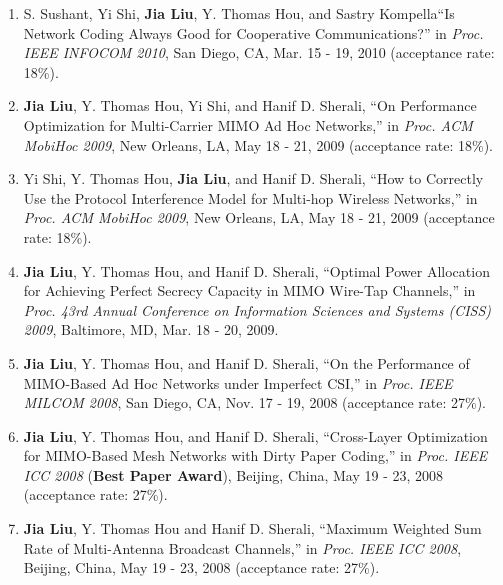 \documentclass[overlapped,line,letterpaper]{res1}
\begin{document}
\begin{resume}
\begin{enumerate}
\vspace*{.08in} \item S. Sushant, Yi Shi, \textbf{Jia Liu}, Y. Thomas Hou, and Sastry Kompella``Is Network Coding Always Good for Cooperative Communications?'' in {\em Proc. IEEE INFOCOM 2010}, San Diego, CA, Mar. 15 - 19, 2010 (acceptance rate: 18\%).

\vspace*{.08in} \item \textbf{Jia Liu}, Y. Thomas Hou, Yi Shi, and Hanif D. Sherali, ``On Performance Optimization for Multi-Carrier MIMO Ad Hoc Networks,'' in {\em Proc. ACM MobiHoc 2009}, New Orleans, LA, May 18 - 21, 2009 (acceptance rate: 18\%).

\vspace*{.08in} \item Yi Shi, Y. Thomas Hou, \textbf{Jia Liu}, and Hanif D. Sherali, ``How to Correctly Use the Protocol Interference Model for Multi-hop Wireless Networks,'' in {\em Proc. ACM MobiHoc 2009}, New Orleans, LA, May 18 - 21, 2009 (acceptance rate: 18\%).

\vspace*{.08in} \item \textbf{Jia Liu}, Y. Thomas Hou, and Hanif D. Sherali, ``Optimal Power Allocation for Achieving Perfect Secrecy Capacity in MIMO Wire-Tap Channels,'' in {\em Proc. 43rd Annual Conference on Information Sciences and Systems (CISS) 2009}, Baltimore, MD, Mar. 18 - 20, 2009.

\vspace*{.08in} \item \textbf{Jia Liu}, Y. Thomas Hou, and Hanif D. Sherali, ``On the Performance of MIMO-Based Ad Hoc Networks under Imperfect CSI,'' in {\em Proc. IEEE MILCOM 2008}, San Diego, CA, Nov. 17 - 19, 2008 (acceptance rate: 27\%).

\vspace*{.08in} \item \textbf{Jia Liu}, Y. Thomas Hou, and Hanif D. Sherali, ``Cross-Layer Optimization for MIMO-Based Mesh Networks with Dirty Paper Coding,'' in {\em Proc. IEEE ICC 2008} ({\bf Best Paper Award}), Beijing, China, May 19 - 23, 2008 (acceptance rate: 27\%).

\vspace*{.08in} \item \textbf{Jia Liu}, Y. Thomas Hou and Hanif D. Sherali, ``Maximum Weighted Sum Rate of Multi-Antenna Broadcast Channels,'' in {\em Proc. IEEE ICC 2008}, Beijing, China, May 19 - 23, 2008 (acceptance rate: 27\%).


\end{enumerate}
\end{resume}
\end{document}

